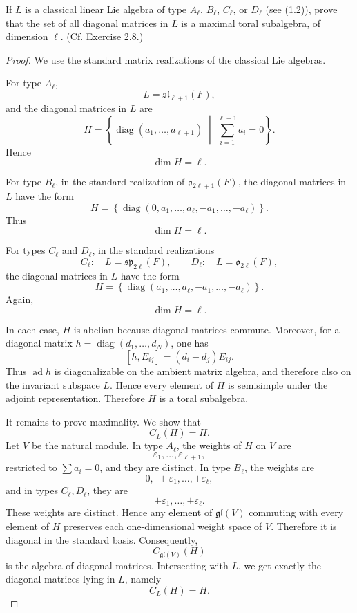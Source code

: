 \begin{exercise}
    [P41, Ex1] If \(L\) is a classical linear Lie algebra of type \(A_\ell\), \(B_\ell\), \(C_\ell\), or \(D_\ell\) (see (1.2)), prove that the set of all diagonal matrices in \(L\) is a maximal toral subalgebra, of dimension \(\ell\). (Cf. Exercise 2.8.)
\end{exercise}

\begin{proof}
    We use the standard matrix realizations of the classical Lie algebras.
    
    For type \(A_\ell\),
    \[
    L=\mathfrak{sl}_{\ell+1}(F),
    \]
    and the diagonal matrices in \(L\) are
    \[
    H
    =
    \left\{
    \operatorname{diag}(a_1,\ldots,a_{\ell+1})
    \;\middle|\;
    \sum_{i=1}^{\ell+1}a_i=0
    \right\}.
    \]
    Hence
    \[
    \dim H=\ell.
    \]
    
    For type \(B_\ell\), in the standard realization of \(\mathfrak{o}_{2\ell+1}(F)\),
    the diagonal matrices in \(L\) have the form
    \[
    H
    =
    \left\{
    \operatorname{diag}(0,a_1,\ldots,a_\ell,-a_1,\ldots,-a_\ell)
    \right\}.
    \]
    Thus
    \[
    \dim H=\ell.
    \]
    
    For types \(C_\ell\) and \(D_\ell\), in the standard realizations
    \[
    C_\ell:\quad L=\mathfrak{sp}_{2\ell}(F),
    \qquad
    D_\ell:\quad L=\mathfrak{o}_{2\ell}(F),
    \]
    the diagonal matrices in \(L\) have the form
    \[
    H
    =
    \left\{
    \operatorname{diag}(a_1,\ldots,a_\ell,-a_1,\ldots,-a_\ell)
    \right\}.
    \]
    Again,
    \[
    \dim H=\ell.
    \]
    
    In each case, \(H\) is abelian because diagonal matrices commute. Moreover, for
    a diagonal matrix \(h=\operatorname{diag}(d_1,\ldots,d_N)\), one has
    \[
    [h,E_{ij}]=(d_i-d_j)E_{ij}.
    \]
    Thus \(\operatorname{ad}h\) is diagonalizable on the ambient matrix algebra, and
    therefore also on the invariant subspace \(L\). Hence every element of \(H\) is
    semisimple under the adjoint representation. Therefore \(H\) is a toral subalgebra.
    
    It remains to prove maximality. We show that
    \[
    C_L(H)=H.
    \]
    Let \(V\) be the natural module. In type \(A_\ell\), the weights of \(H\) on \(V\)
    are
    \[
    \varepsilon_1,\ldots,\varepsilon_{\ell+1},
    \]
    restricted to \(\sum a_i=0\), and they are distinct. In type \(B_\ell\), the weights
    are
    \[
    0,\;\pm\varepsilon_1,\ldots,\pm\varepsilon_\ell,
    \]
    and in types \(C_\ell,D_\ell\), they are
    \[
    \pm\varepsilon_1,\ldots,\pm\varepsilon_\ell.
    \]
    These weights are distinct. Hence any element of \(\mathfrak{gl}(V)\) commuting
    with every element of \(H\) preserves each one-dimensional weight space of \(V\).
    Therefore it is diagonal in the standard basis. Consequently,
    \[
    C_{\mathfrak{gl}(V)}(H)
    \]
    is the algebra of diagonal matrices. Intersecting with \(L\), we get exactly the
    diagonal matrices lying in \(L\), namely
    \[
    C_L(H)=H.
    \]
    

\end{proof}
